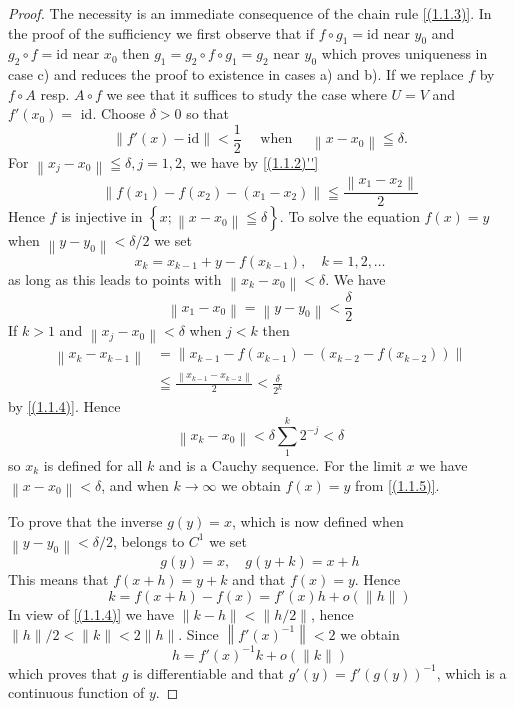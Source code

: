 \begin{proof}
    The necessity is an immediate consequence of the chain rule \eqref{(1.1.3)}. In the proof of the sufficiency we first observe that if $f \circ g_{1}=\mathrm{id}$ near $y_{0}$ and $g_{2} \circ f=\mathrm{id}$ near $x_{0}$ then $g_{1}=g_{2} \circ f \circ g_{1}=g_{2}$ near $y_{0}$ which proves uniqueness in case c) and reduces the proof to existence in cases a) and b). If we replace $f$ by $f \circ A$ resp. $A \circ f$ we see that it suffices to study the case where $U=V$ and $f'(x_0)=$ id. Choose $\delta>0$ so that
\[
	\left\|f'(x)-\mathrm{id}\right\|<\frac{1}{2} \quad \text { when } \quad\left\|x-x_{0}\right\| \leqq \delta.
\]
For $\left\|x_{j}-x_{0}\right\| \leqq \delta, j=1,2$, we have by \eqref{(1.1.2)''}
\begin{equation}
    \label{(1.1.4)}
	\left\|f\left(x_{1}\right)-f\left(x_{2}\right)-\left(x_{1}-x_{2}\right)\right\| \leqq \frac{\left\|x_{1}-x_{2}\right\|}{2}
\end{equation}
Hence $f$ is injective in $\left\{x ;\left\|x-x_{0}\right\| \leqq \delta\right\}$. To solve the equation $f(x)=y$ when $\left\|y-y_{0}\right\|<\delta / 2$ we set
\begin{equation}
    \label{(1.1.5)}
	x_{k}=x_{k-1}+y-f\left(x_{k-1}\right), \quad k=1,2, \ldots
\end{equation}
as long as this leads to points with $\left\|x_{k}-x_{0}\right\|<\delta$. We have
\[
	\left\|x_{1}-x_{0}\right\|=\left\|y-y_{0}\right\|<\frac{\delta}{2}
\]
If $k>1$ and $\left\|x_{j}-x_{0}\right\|<\delta$ when $j<k$ then
\[
	\begin{aligned}
		\left\|x_{k}-x_{k-1}\right\| & =\left\|x_{k-1}-f\left(x_{k-1}\right)-\left(x_{k-2}-f\left(x_{k-2}\right)\right)\right\| \\
		                             & \leqq \frac{\left\|x_{k-1}-x_{k-2}\right\|}{2} < \frac\delta{2^{k}}
	\end{aligned}
\]
by \eqref{(1.1.4)}. Hence
\[
	\left\|x_{k}-x_{0}\right\|<\delta \sum_{1}^{k} 2^{-j}<\delta
\]
so $x_{k}$ is defined for all $k$ and is a Cauchy sequence. For the limit $x$ we have $\left\|x-x_{0}\right\|<\delta$, and when $k \rightarrow \infty$ we obtain $f(x)=y$ from \eqref{(1.1.5)}.

To prove that the inverse $g(y)=x$, which is now defined when $\left\|y-y_{0}\right\|<\delta / 2$, belongs to $C^{1}$ we set
\[
	g(y)=x, \quad g(y+k)=x+h
\]
This means that $f(x+h)=y+k$ and that $f(x)=y$. Hence
\[
	k=f(x+h)-f(x)=f'(x) h+o(\|h\|)
\]
In view of \eqref{(1.1.4)} we have $\|k-h\|<\|h / 2\|$, hence $\|h\| / 2<\|k\|<2\|h\|$. Since $\left\|f'(x)^{-1}\right\|<2$ we obtain
\[
	h=f'(x)^{-1} k+o(\|k\|)
\]
which proves that $g$ is differentiable and that $g'(y)=f'(g(y))^{-1}$, which is a continuous function of $y$.
\end{proof}

